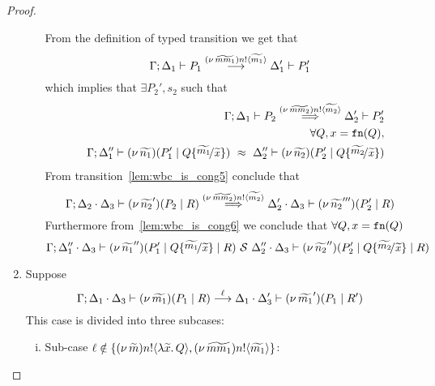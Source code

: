 \begin{proof}
\begin{enumerate}
\begin{enumerate}[i.]
							\noi From the definition of typed transition we get that
							\[
								\Gamma; \Delta_1 \vdash P_1 \stackrel{(\nu\, \widetilde{mm_1}) n ! \langle \widetilde{m_1} \rangle}{\longrightarrow} \Delta_1' \vdash P_1'
							\]
							\noi which implies that $\exists P_2', s_2$ such that
							\begin{eqnarray}
								&& \horel{\Gamma}{\Delta_1}{P_2}
								{\By{\news{\widetilde{mm_2}} \bactout{n}{\widetilde{m_2}}}}
								{\Delta_2'}{P_2'}
								\label{lem:wbc_is_cong5}\\
								&&\forall Q, x = \fn{Q}, \nonumber \\%
								&& \horel{\Gamma}{\Delta_1''}{\newsp{\widetilde{n_1}}{P_1' \Par Q \subst{\widetilde{m_1}}{\widetilde{x}}}}
								{\ \wbc\ }
								{\Delta_2''}{\newsp{\widetilde{n_2}}{P_2' \Par Q \subst{\widetilde{m_2}}{\widetilde{x}}}}
								\label{lem:wbc_is_cong6}
							\end{eqnarray}
						\noi From transition~\eqref{lem:wbc_is_cong5} conclude that 
						\[
							\Gamma; \Delta_2 \cdot \Delta_3 \vdash (\nu\, \widetilde{n_2}')(P_2 \;|\; R) \stackrel{(\nu\, \widetilde{mm_2}) n ! \langle \widetilde{m_2} \rangle}{\Longrightarrow} \Delta_2' \cdot \Delta_3 \vdash (\nu\, \widetilde{n_2}''')(P_2' \;|\; R)
						\]
						\noi Furthermore from~\eqref{lem:wbc_is_cong6} we conclude that $\forall Q, x = \mathtt{fn}(Q)$
						\[
							\horel{\Gamma}{\Delta_1'' \cat \Delta_3}{\newsp{\widetilde{n_1}''}{P_1' \Par Q \subst{\widetilde{m_1}}{\widetilde{x}} \Par R}}
							{\ \mathcal{S}\ }
							{\Delta_2'' \cat \Delta_3}{\newsp{\widetilde{n_2}''}{P_2' \Par Q \subst{\widetilde{m_2}}{\widetilde{x}} \Par R}}
						\]
				\end{enumerate}

		\item Suppose
				\[
					\Gamma; \Delta_1 \cdot \Delta_3 \vdash (\nu\, \widetilde{m_1})(P_1 \;|\; R) \stackrel{\ell}{\longrightarrow} \Delta_1 \cdot \Delta_3' \vdash (\nu\, \widetilde{m_1}')(P_1 \;|\; R')
				\]
				\noi This case is divided into three subcases:

				\begin{enumerate}[i.]
					\item Sub-case 	$\ell \notin \{(\nu\, \widetilde{m}) n ! \langle \lambda \widetilde{x}.\,Q \rangle, (\nu\, \widetilde{mm_1}) n ! \langle \widetilde{m_1} \rangle\}$:


\end{enumerate}
\end{enumerate}
\end{proof}
